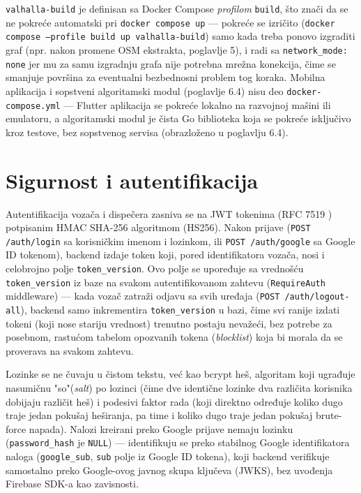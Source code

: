 \setlength{\tabcolsep}{6pt}
\renewcommand{\arraystretch}{1}


\texttt{valhalla-build} je definisan sa Docker Compose \emph{profilom} \texttt{build}, što znači da se ne pokreće automatski pri \texttt{docker compose up} — pokreće se izričito (\texttt{docker compose --profile build up valhalla-build}) samo kada treba ponovo izgraditi graf (npr. nakon promene OSM ekstrakta, poglavlje 5), i radi sa \texttt{network\_mode: none} jer mu za samu izgradnju grafa nije potrebna mrežna konekcija, čime se smanjuje površina za eventualni bezbednosni problem tog koraka. Mobilna aplikacija i sopstveni algoritamski modul (poglavlje 6.4) nisu deo \texttt{docker-compose.yml} — Flutter aplikacija se pokreće lokalno na razvojnoj mašini ili emulatoru, a algoritamski modul je čista Go biblioteka koja se pokreće isključivo kroz testove, bez sopstvenog servisa (obrazloženo u poglavlju 6.4).

\section{Sigurnost i autentifikacija}

Autentifikacija vozača i dispečera zasniva se na JWT tokenima (RFC 7519 \cite{jwt}) potpisanim HMAC SHA-256 algoritmom (HS256). Nakon prijave (\texttt{POST /auth/login} sa korisničkim imenom i lozinkom, ili \texttt{POST /auth/google} sa Google ID tokenom), backend izdaje token koji, pored identifikatora vozača, nosi i celobrojno polje \texttt{token\_version}. Ovo polje se upoređuje sa vrednošću \texttt{token\_version} iz baze na svakom autentifikovanom zahtevu (\texttt{RequireAuth} middleware) — kada vozač zatraži odjavu sa svih uređaja (\texttt{POST /auth/logout-all}), backend samo inkrementira \texttt{token\_version} u bazi, čime svi ranije izdati tokeni (koji nose stariju vrednost) trenutno postaju nevažeći, bez potrebe za posebnom, rastućom tabelom opozvanih tokena (\emph{blocklist}) koja bi morala da se proverava na svakom zahtevu.

Lozinke se ne čuvaju u čistom tekstu, već kao bcrypt heš, algoritam koji ugrađuje nasumičnu "so"(\emph{salt}) po lozinci (čime dve identične lozinke dva različita korisnika dobijaju različit heš) i podesivi faktor rada (koji direktno određuje koliko dugo traje jedan pokušaj heširanja, pa time i koliko dugo traje jedan pokušaj brute-force napada). Nalozi kreirani preko Google prijave nemaju lozinku (\texttt{password\_hash} je \texttt{NULL}) — identifikuju se preko stabilnog Google identifikatora naloga (\texttt{google\_sub}, \texttt{sub} polje iz Google ID tokena), koji backend verifikuje samostalno preko Google-ovog javnog skupa ključeva (JWKS), bez uvođenja Firebase SDK-a kao zavisnosti.

